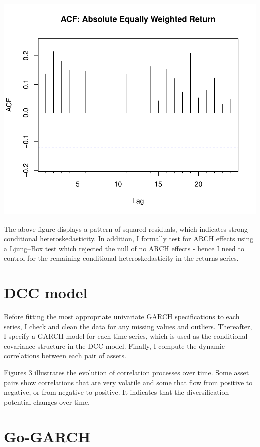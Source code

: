 \documentclass[11pt,preprint, authoryear]{elsarticle}
\numberwithin{equation}{section}
\numberwithin{figure}{section}
\numberwithin{table}{section}
\begin{document}
\includegraphics{FinMetrics-Essay_files/figure-latex/unnamed-chunk-6-1.pdf}

The above figure displays a pattern of squared residuals, which
indicates strong conditional heteroskedasticity. In addition, I formally
test for ARCH effects using a Ljung--Box test which rejected the null of
no ARCH effects - hence I need to control for the remaining conditional
heteroskedasticity in the returns series.

\hypertarget{dcc-model}{%
\section{DCC model}\label{dcc-model}}

Before fitting the most appropriate univariate GARCH specifications to
each series, I check and clean the data for any missing values and
outliers. Thereafter, I specify a GARCH model for each time series,
which is used as the conditional covariance structure in the DCC model.
Finally, I compute the dynamic correlations between each pair of assets.

Figures 3 illustrates the evolution of correlation processes over time.
Some asset pairs show correlations that are very volatile and some that
flow from positive to negative, or from negative to positive. It
indicates that the diversification potential changes over time.

\hypertarget{go-garch}{%
\section{Go-GARCH}\label{go-garch}}
\end{document}
